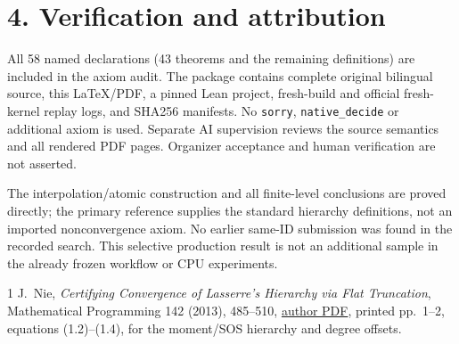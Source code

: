 \documentclass[10pt]{article}
\begin{document}
\section*{4. Verification and attribution}
All 58 named declarations (43 theorems and the remaining definitions) are included in the axiom audit. The package contains complete original bilingual source, this LaTeX/PDF, a pinned Lean project, fresh-build and official fresh-kernel replay logs, and SHA256 manifests. No \texttt{sorry}, \texttt{native\_decide} or additional axiom is used. Separate AI supervision reviews the source semantics and all rendered PDF pages. Organizer acceptance and human verification are not asserted.

The interpolation/atomic construction and all finite-level conclusions are proved directly; the primary reference supplies the standard hierarchy definitions, not an imported nonconvergence axiom. No earlier same-ID submission was found in the recorded search. This selective production result is not an additional sample in the already frozen workflow or CPU experiments.
\begin{thebibliography}{1}
 J.~Nie, \emph{Certifying Convergence of Lasserre's Hierarchy via Flat Truncation}, Mathematical Programming 142 (2013), 485--510, \href{https://mathweb.ucsd.edu/~njw/PUBLICPAPERS/FlaTrn.pdf}{author PDF}, printed pp.~1--2, equations (1.2)--(1.4), for the moment/SOS hierarchy and degree offsets.
\end{thebibliography}
\end{document}
